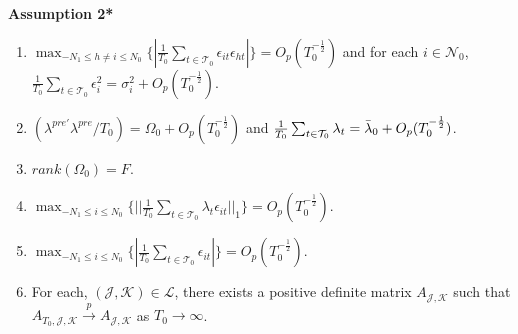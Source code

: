 \documentclass{article}
\begin{document}
\textbf{Assumption 2*} \label{A2*}
\begin{enumerate}
    \item $\max_{-N_1 \leq h \ne i \leq N_0} \{ | \frac{1}{T_0} \sum_{t \in \mathcal{T}_0} \epsilon_{it}\epsilon_{ht} | \} = O_p(T_0^{-\frac{1}{2}})$ and for each $i \in \mathcal{N}_0$, $\frac{1}{T_0} \sum_{t \in \mathcal{T}_0} \epsilon_i^2 = \sigma_i^2 + O_p(T_0^{-\frac{1}{2}})$.
    \item $(\lambda^{pre'}\lambda^{pre}/T_0) = \Omega_0 + O_p(T_0^{-\frac{1}{2}})$ and $\frac{1}{T_0}\sum_{t \in \mathcal{T}_0} \lambda_t = \Bar{\lambda}_0 + O_p(T_0^{-\frac{1}{2}})$.
    \item $rank(\Omega_0) = F$.
    \item $\max_{-N_1 \leq i \leq N_0} \{ || \frac{1}{T_0} \sum_{t \in \mathcal{T}_0} \lambda_{t} \epsilon_{it} ||_1 \} = O_p(T_0^{-\frac{1}{2}})$.
    \item $\max_{-N_1 \leq i \leq N_0} \{| \frac{1}{T_0} \sum_{t \in \mathcal{T}_0} \epsilon_{it} | \} = O_p(T_0^{-\frac{1}{2}})$.
    \item For each, $(\mathcal{\mathcal{J}},\mathcal{K}) \in \mathcal{L}$, there exists a positive definite matrix $A_{\mathcal{J},\mathcal{K}}$ such that $A_{T_0,\mathcal{J},\mathcal{K}} \overset{p}{\rightarrow} A_{\mathcal{J},\mathcal{K}}$ as $T_0 \rightarrow \infty$.
\end{enumerate}
\end{document}

